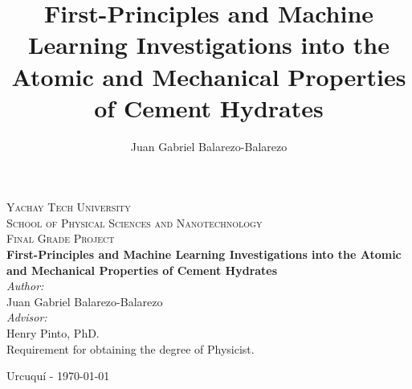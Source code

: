 \documentclass[11pt, titlepage, twoside, openright, usernames, dvipsnames]{thesis}
\title{First-Principles and Machine Learning Investigations into the Atomic and
       Mechanical Properties of Cement Hydrates}
\author{Juan Gabriel Balarezo-Balarezo}
\theoremstyle{definition}
\theoremstyle{definition}
\begin{document}
\begin{titlepage}
  \thispagestyle{fancy} %
  \fancyhf{} %

  
  \vspace*{2cm} %
  \begin{center}
    \textsc{\huge Yachay Tech University}\\
    \vspace*{1cm} %
    \textsc{\LARGE School of Physical Sciences and Nanotechnology}\\[1.5cm]
    \textsc{\LARGE Final Grade Project}\\[1cm]
    {\huge \bfseries First-Principles and Machine Learning Investigations into the Atomic and Mechanical Properties of Cement Hydrates}\\[2cm]
    {\large 
    \emph{Author:}\\ 
    Juan Gabriel Balarezo-Balarezo\\[1cm]

    \emph{Advisor:} \\
    Henry Pinto, PhD.\\[1cm]
    }
    Requirement for obtaining the degree of Physicist.
    \vspace{1cm}

    Urcuquí - \today
  \end{center}
\end{titlepage}
%
\end{document}
